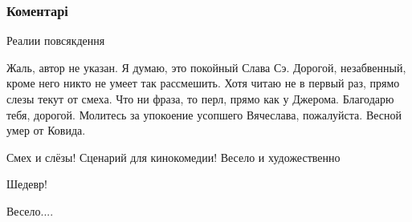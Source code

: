  
 
 
 
 
\subsubsection{Коментарі}
\label{sec:18_10_2021.fb.maslov_evgenij.1.gorod_jumor.cmt}

\begin{itemize} %
Реалии повсякдення


Жаль, автор не указан. Я думаю, это покойный Слава Сэ. Дорогой, незабвенный,
кроме него никто не умеет так рассмешить. Хотя читаю не в первый раз, прямо
слезы текут от смеха. Что ни фраза, то перл, прямо как у Джерома. Благодарю
тебя, дорогой. Молитесь за упокоение усопшего Вячеслава, пожалуйста. Весной
умер от Ковида.

Смех и слёзы! Сценарий для кинокомедии! Весело и художественно

Шедевр!

Весело....

\end{itemize} %
